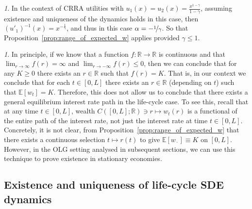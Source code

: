 \documentclass[11pt,oneside,english,reqno,dvipsnames,table]{amsart}
\numberwithin{equation}{section}
\theoremstyle{plain}
\theoremstyle{definition}
\theoremstyle{remark}
\newtheorem{rem}[thm]{\protect\remarkname}
\theoremstyle{plain}
\theoremstyle{plain}
\theoremstyle{plain}
\theoremstyle{plain}
\theoremstyle{plain}
\theoremstyle{plain}
\theoremstyle{plain}
\providecommand{\remarkname}{Remark}
\providecommand{\remarkname}{Remark}
\newcommand{\blue}[1]{#1}
\newcommand{\EE}{\mathbb{E}}
\newcommand{\RR}{\mathbb{R}}
\newcommand{\mbE}{\mathbb{E}}
\newcommand{\mbR}{\mathbb{R}}
\numberwithin{thm}{section}
\begin{document}
\begin{rem}\label{rem:natural_borrowing_gamma_leq_1}
%
    In the context of CRRA utilities with $u_1(x)=u_2(x)=\frac{x^{1-\gamma}}{1-\gamma}$, \blue{assuming existence and uniqueness of the dynamics holds in this case}, then $(u'_1)^{-1}(x)=x^{-\frac{1}{\gamma}}$, and thus in this case $\alpha=-\nicefrac{1}{\gamma}$. So that Proposition~\ref{prop:range_of_expected_w} applies provided $\gamma\leq 1$. 
\end{rem}

\begin{rem}
  In principle, if we know that a function $f:\RR\rightarrow \RR$ is continuous and that $\lim_{r\rightarrow \infty}f(r)=\infty$ and $\lim_{r\rightarrow-\infty}f(r)\leq 0$, 
  then we can conclude that for any $K\geq 0$ there exists an $r\in \RR$ such that $f(r)=K$. That is, in our context we conclude that for each $t\in [0,L]$ there exists an $r \in \RR$ (depending on $t$) such that $\EE[w_t]=K$. Therefore, this does not allow us to conclude that there exists a general equilibrium interest rate path in the life-cycle case. To see this, recall that at any time $t\in [0,L]$, wealth $C([0,L];\mbR) \ni r\mapsto w_t(r)$ is a functional of the entire path of the interest rate, not just the interest rate at time $t\in [0,L]$. Concretely, it is not clear, from Proposition~\ref{prop:range_of_expected_w} that there exists a continuous selection $t\mapsto r(t)$ to give $\mbE[w_{\,\cdot\,}] \equiv K $ on $[0,L]$. However, in the OLG setting analysed in subsequent sections, we can use this technique to prove existence in stationary economies.
\end{rem}

% 
\subsection{Existence and uniqueness of life-cycle SDE dynamics}\label{sec:life_cycle}
\end{document}
